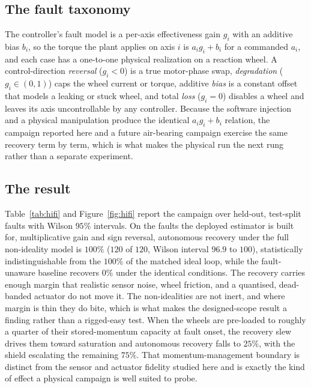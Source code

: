 \documentclass[11pt]{article}
\begin{document}
\subsection{The fault taxonomy} The controller's fault model is a
per-axis effectiveness gain $g_i$ with an additive bias $b_i$, so the torque the plant applies on
axis $i$ is $a_i g_i + b_i$ for a commanded $a_i$, and each case has a one-to-one physical
realization on a reaction wheel. A control-direction \emph{reversal} ($g_i<0$) is a true
motor-phase swap, \emph{degradation} ($g_i\in(0,1)$) caps the wheel current or torque, additive
\emph{bias} is a constant offset that models a leaking or stuck wheel, and total \emph{loss}
($g_i=0$) disables a wheel and leaves its axis uncontrollable by any controller. Because the
software injection and a physical manipulation produce the identical $a_i g_i + b_i$ relation, the
campaign reported here and a future air-bearing campaign exercise the same recovery term by term,
which is what makes the physical run the next rung rather than a separate experiment.

\subsection{The result} Table~\ref{tab:hifi} and Figure~\ref{fig:hifi} report the campaign over
held-out, test-split faults with Wilson $95\%$ intervals. On the faults the deployed estimator is
built for, multiplicative gain and sign reversal, autonomous recovery under the full non-ideality
model is $100\%$ ($120$ of
$120$, Wilson interval $96.9$ to $100$), statistically indistinguishable from the $100\%$ of the
matched ideal loop, while the fault-unaware baseline recovers $0\%$ under the identical conditions.
The recovery carries enough margin that realistic sensor noise, wheel friction, and a quantised,
dead-banded actuator do not move it. The non-idealities are not inert, and where margin is thin
they do bite, which is what makes the designed-scope result a finding rather than a rigged-easy
test. When the wheels are pre-loaded to roughly a quarter of their stored-momentum capacity at
fault onset, the recovery slew drives them toward saturation and autonomous recovery falls to
$25\%$, with the shield escalating the remaining $75\%$. That momentum-management boundary is
distinct from the sensor and actuator fidelity studied here and is exactly the kind of effect a
physical campaign is well suited to probe.
\end{document}
